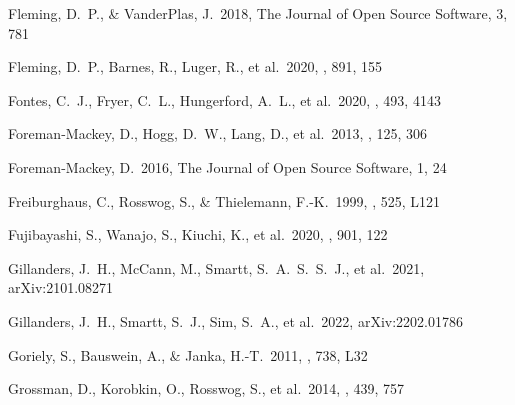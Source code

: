 \documentclass[twocolumn, twocolappendix]{aastex63}
\begin{document}
\begin{thebibliography}{}


 Fleming, D.~P., \& VanderPlas, J.\ 2018, The Journal of Open Source Software, 3, 781


 Fleming, D.~P., Barnes, R., Luger, R., et al.\ 2020, \apj, 891, 155


 Fontes, C.~J., Fryer, C.~L., Hungerford, A.~L., et al.\ 2020, \mnras, 493, 4143


 Foreman-Mackey, D., Hogg, D.~W., Lang, D., et al.\ 2013, \pasp, 125, 306


 Foreman-Mackey, D.\ 2016, The Journal of Open Source Software, 1, 24







 
 Freiburghaus, C., Rosswog, S., \& Thielemann, F.-K.\ 1999, \apjl, 525, L121


 Fujibayashi, S., Wanajo, S., Kiuchi, K., et al.\ 2020, \apj, 901, 122


 Gillanders, J.~H., McCann, M., Smartt, S.~A.~S.~S.~J., et al.\ 2021, arXiv:2101.08271


 Gillanders, J.~H., Smartt, S.~J., Sim, S.~A., et al.\ 2022, arXiv:2202.01786




 Goriely, S., Bauswein, A., \& Janka, H.-T.\ 2011, \apjl, 738, L32


 Grossman, D., Korobkin, O., Rosswog, S., et al.\ 2014, \mnras, 439, 757



\end{thebibliography}
\end{document}
